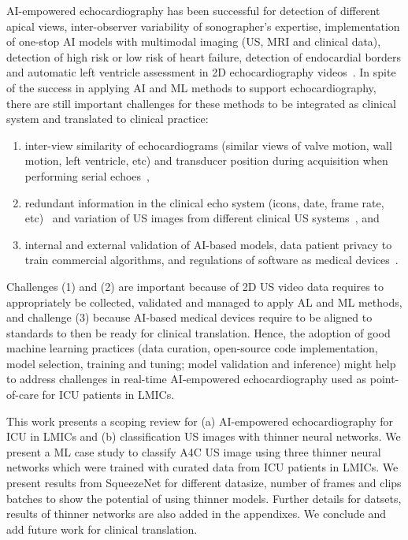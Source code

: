 \documentclass[mlabstract,twocolumn]{jmlr}
\begin{document}
AI-empowered echocardiography has been successful for detection of different apical views, inter-observer variability of sonographer's expertise, implementation of one-stop AI models with multimodal imaging (US, MRI and clinical data), detection of high risk or low risk of heart failure, detection of endocardial borders and automatic left ventricle assessment in 2D echocardiography videos~\citep{tromp2022, zhang2022-mdpi, behnami2020, ono2022}.
In spite of the success in applying AI and ML methods to support echocardiography, there are still important challenges for these methods to be integrated as clinical system and translated to clinical practice:
\begin{enumerate}
\setlength\itemsep{0em}
\item inter-view similarity of echocardiograms (similar views of valve motion, wall motion, left ventricle, etc) and transducer position during acquisition when performing serial echoes~\citep{zhang2018},
\item redundant information in the clinical echo system (icons, date, frame rate, etc)~\citep{khamis2017} and variation of US images from different clinical US systems~\citep{brindise2020unsupervised}, and
\item internal and external validation of AI-based models, data patient privacy to train commercial algorithms, and regulations of software as medical devices~\citep{2022_Stewart_Emergency_Medicine_Australasia}.
\end{enumerate}
Challenges (1) and (2) are important because of 2D US video data requires to appropriately be collected, validated and managed to apply AL and ML methods, and challenge (3) because AI-based medical devices require to be aligned to standards to then be ready for clinical translation.
Hence, the adoption of good machine learning practices (data curation, open-source code implementation, model selection, training and tuning; model validation and inference) might help to address challenges in real-time AI-empowered echocardiography used as point-of-care for ICU patients in LMICs.

This work presents a scoping review for (a) AI-empowered echocardiography for ICU in LMICs and (b) classification US images with thinner neural networks.
We present a ML case study to classify A4C US image using three thinner neural networks which were trained with curated data from ICU patients in LMICs.
We present results from SqueezeNet for different datasize, number of frames and clips batches to show the potential of using thinner models.
Further details for datsets, results of thinner networks are also added in the appendixes.
We conclude and add future work for clinical translation.
\end{document}
